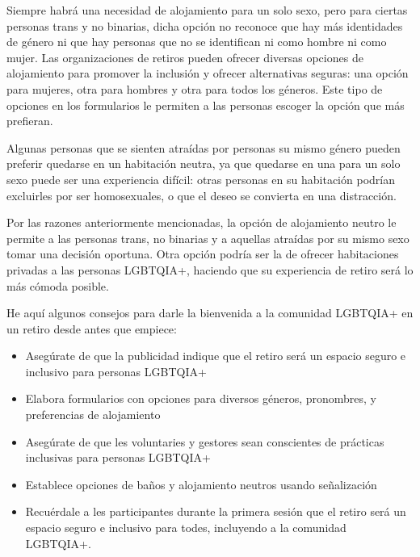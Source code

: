 \documentclass[12pt,openany]{book}
\begin{document}
Siempre habrá una necesidad de alojamiento para un solo sexo, pero para ciertas personas trans y no binarias, dicha opción no reconoce que hay más identidades de género ni que hay personas que no se identifican ni como hombre ni como mujer. Las organizaciones de retiros pueden ofrecer diversas opciones de alojamiento para promover la inclusión y ofrecer alternativas seguras: una opción para mujeres, otra para hombres y otra para todos los géneros. Este tipo de opciones en los formularios le permiten a las personas escoger la opción que más prefieran.

Algunas personas que se sienten atraídas por personas su mismo género pueden preferir quedarse en un habitación neutra, ya que quedarse en una para un solo sexo puede ser una experiencia difícil: otras personas en su habitación podrían excluirles por ser homosexuales, o que el deseo se convierta en una distracción.

Por las razones anteriormente mencionadas, la opción de alojamiento neutro le permite a las personas trans, no binarias y a aquellas atraídas por su mismo sexo tomar una decisión oportuna. Otra opción podría ser la de ofrecer habitaciones privadas a las personas LGBTQIA+, haciendo que su experiencia de retiro será lo más cómoda posible.

He aquí algunos consejos para darle la bienvenida a la comunidad LGBTQIA+ en un retiro desde antes que empiece:

\begin{itemize}
  \setlength\itemsep{-0.3em}
  \item Asegúrate de que la publicidad indique que el retiro será un espacio seguro e inclusivo para personas LGBTQIA+
  \item Elabora formularios con opciones para diversos géneros, pronombres, y preferencias de alojamiento
  \item Asegúrate de que les voluntaries y gestores sean conscientes de prácticas inclusivas para personas LGBTQIA+
  \item Establece opciones de baños y alojamiento neutros usando señalización
  \item Recuérdale a les participantes durante la primera sesión que el retiro será un espacio seguro e inclusivo para todes, incluyendo a la comunidad LGBTQIA+.
\end{itemize}

\begin{figure}[h]
    \centering
\end{figure}
\end{document}
